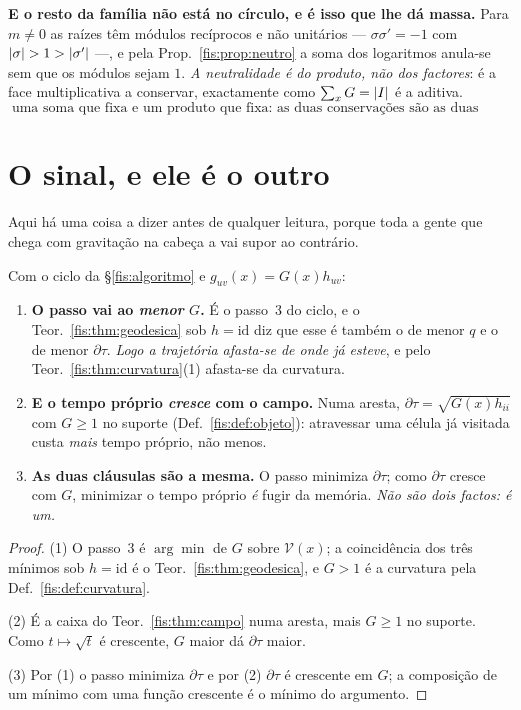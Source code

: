 \documentclass[livro.tex]{subfiles}
\begin{document}
\medskip\noindent\textbf{E o resto da família não está no círculo, e é isso que
lhe dá massa.} Para $m\neq0$ as raízes têm módulos recíprocos e não unitários ---
$\sigma\sigma'=-1$ com $\lvert \sigma\rvert>1>\lvert \sigma'\rvert$ ---, e pela
Prop.~\ref{fis:prop:neutro} a soma dos logaritmos anula-se sem que os módulos
sejam $1$. \emph{A neutralidade é do produto, não dos factores}: é a face
multiplicativa a conservar, exactamente como $\sum_x G=\lvert I\rvert$ é a aditiva.
\[
\boxed{\;\text{uma soma que fixa e um produto que fixa: as duas conservações são as duas faces.}\;}
\]

\section{O sinal, e ele é o outro}\label{fis:grav-sinal}

\noindent Aqui há uma coisa a dizer antes de qualquer leitura, porque toda a
gente que chega com gravitação na cabeça a vai supor ao contrário.

\begin{teorema}\label{fis:thm:sinal}
Com o ciclo da §\ref{fis:algoritmo} e $g_{uv}(x)=G(x)h_{uv}$:
\begin{enumerate}\itemsep3pt
\item[(1)] \textbf{O passo vai ao \emph{menor} $G$.} É o passo~3 do ciclo, e o
Teor.~\ref{fis:thm:geodesica} sob $h=\mathrm{id}$ diz que esse é também o de
menor $q$ e o de menor $\partial\tau$. \emph{Logo a trajetória afasta-se de onde
já esteve}, e pelo Teor.~\ref{fis:thm:curvatura}(1) afasta-se da curvatura.
\item[(2)] \textbf{E o tempo próprio \emph{cresce} com o campo.} Numa aresta,
$\partial\tau=\sqrt{G(x)h_{ii}}$ com $G\ge1$ no suporte
(Def.~\ref{fis:def:objeto}): atravessar uma célula já visitada custa \emph{mais}
tempo próprio, não menos.
\item[(3)] \textbf{As duas cláusulas são a mesma.} O passo minimiza
$\partial\tau$; como $\partial\tau$ cresce com $G$, minimizar o tempo próprio
\emph{é} fugir da memória. \emph{Não são dois factos: é um.}
\end{enumerate}
\end{teorema}

\begin{proof}
(1) O passo~3 é $\arg\min$ de $G$ sobre $\mathcal{V}(x)$; a coincidência dos três
mínimos sob $h=\mathrm{id}$ é o Teor.~\ref{fis:thm:geodesica}, e $G>1$ é a
curvatura pela Def.~\ref{fis:def:curvatura}.

(2) É a caixa do Teor.~\ref{fis:thm:campo} numa aresta, mais $G\ge1$ no suporte.
Como $t\mapsto\sqrt t$ é crescente, $G$ maior dá $\partial\tau$ maior.

(3) Por (1) o passo minimiza $\partial\tau$ e por (2) $\partial\tau$ é crescente
em $G$; a composição de um mínimo com uma função crescente é o mínimo do
argumento.
\end{proof}
\end{document}
